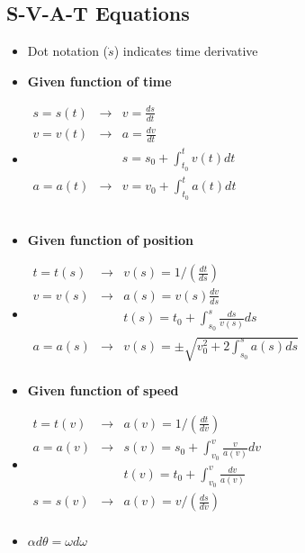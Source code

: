 \documentclass [10pt] {article}
\begin{document}
\begin{multicols*}{2}
\section{S-V-A-T Equations}
	\begin{itemize}
		\item Dot notation ($\dot{s}$) indicates time derivative 
		\item \textbf{Given function of time}
		\item $\begin{array}{rcl}
			s = s(t) & \rightarrow & v = \frac{ds}{dt} \\
			v = v(t) & \rightarrow & a = \frac{dv}{dt} \\
 			& & s = s_0 + \int_{t_0}^t{v(t)}dt \\
			a = a(t) & \rightarrow & v = v_0 + \int_{t_0}^t{a(t)}dt \\\\\\
			\end{array}$
		\item \textbf{Given function of position}
		\item $\begin{array}{rcl}
			t = t(s) & \rightarrow & v(s) = 1/(\frac{dt}{ds}) \\
			v = v(s) & \rightarrow & a(s) = v(s)\frac{dv}{ds} \\
 			& & t(s) = t_0 + \int_{s_0}^s{\frac{ds}{v(s)}}ds \\
			a = a(s) & \rightarrow & v(s) = \pm \sqrt{v_0^2 + 2\int_{s_0}^s{a(s)}ds} \\
			\end{array}$
		\item \textbf{Given function of speed}
		\item $\begin{array}{rcl}
			t = t(v) & \rightarrow & a(v) = 1/(\frac{dt}{dv}) \\
			a = a(v) & \rightarrow & s(v) = s_0 + \int_{v_0}^v{\frac{v}{a(v)}}dv \\
			 & & t(v) = t_0 + \int_{v_0}^v{\frac{dv}{a(v)}} \\
			s = s(v) & \rightarrow & a(v) = v/(\frac{ds}{dv}) \\
			\end{array}$
		\item $\alpha d\theta = \omega d\omega $
	\end{itemize}

\end{multicols*}
\end{document}
